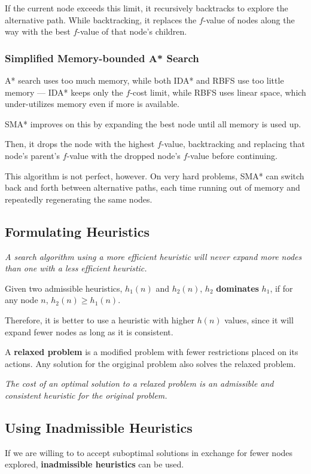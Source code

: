         If the current node exceeds this limit, it recursively backtracks to explore the alternative path. While backtracking, it replaces the $f$-value of nodes along the way with the best $f$-value of that node's children.

        \subsubsection{Simplified Memory-bounded A* Search}
        A* search uses too much memory, while both IDA* and RBFS use too little memory --- IDA* keeps only the $f$-cost limit, while RBFS uses linear space, which under-utilizes memory even if more is available.

        SMA* improves on this by expanding the best node until all memory is used up.

        Then, it drops the node with the highest $f$-value, backtracking and replacing that node's parent's $f$-value with the dropped node's $f$-value before continuing.

        This algorithm is not perfect, however. On very hard problems, SMA* can switch back and forth between alternative paths, each time running out of memory and repeatedly regenerating the same nodes.

    \subsection{Formulating Heuristics}
        \emph{A search algorithm using a more efficient heuristic will never expand more nodes than one with a less efficient heuristic.}

        Given two admissible heuristics, $h_1(n)$ and $h_2(n)$, $h_2$ \textbf{dominates} $h_1$, if for any node $n$, $h_2(n) \ge h_1(n)$.

        Therefore, it is better to use a heuristic with higher $h(n)$ values, since it will expand fewer nodes as long as it is consistent.

        A \textbf{relaxed problem} is a modified problem with fewer restrictions placed on its actions. Any solution for the orgiginal problem also solves the relaxed problem.

        \emph{The cost of an optimal solution to a relaxed problem is an admissible and consistent heuristic for the original problem.}

    \subsection{Using Inadmissible Heuristics}
        If we are willing to to accept suboptimal solutions in exchange for fewer nodes explored, \textbf{inadmissible heuristics} can be used.

